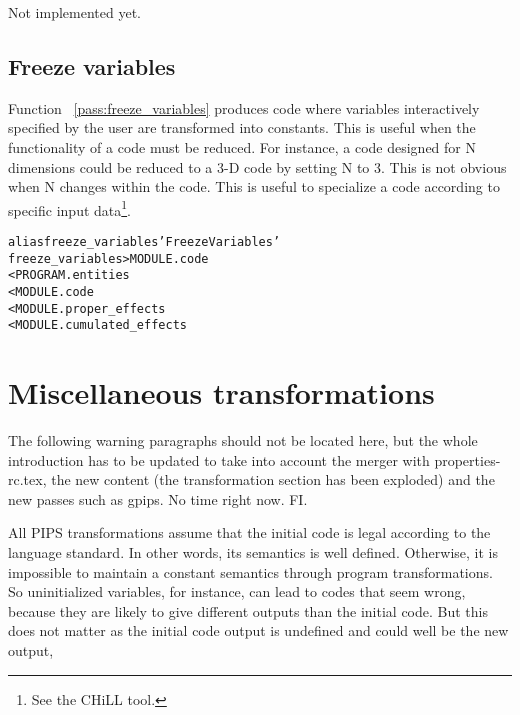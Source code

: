 \documentclass[a4paper]{report}
\newenvironment{PipsMake}{\begin{alltt}}{\end{alltt}}
\newcommand{\PipsPassRef}[1]{\texttt{\detokenize{#1}}~\ref{pass:#1}}
\newenvironment{PipsPass}[1]{\label{pass:#1}}{}
\begin{document}
Not implemented yet.

\subsection{Freeze variables}
\label{subsection-freeze-variables}

\begin{PipsPass}{freeze_variables}
Function \PipsPassRef{freeze_variables} produces code where variables
interactively specified by the user are transformed into
constants. This is useful when the functionality of a code must be
reduced. For instance, a code designed for N dimensions could be
reduced to a 3-D code by setting N to 3. This is not obvious when N
changes within the code.  This is useful to specialize
a code according to specific input data\footnote{See the CHiLL tool.}.
\end{PipsPass}

\begin{PipsMake}
alias freeze_variables 'Freeze Variables'
freeze_variables                   > MODULE.code
        < PROGRAM.entities
        < MODULE.code
        < MODULE.proper_effects
        < MODULE.cumulated_effects
\end{PipsMake}




\section{Miscellaneous transformations}

The following warning paragraphs should not be located here, but the
whole introduction has to be updated to take into account the merger
with properties-rc.tex, the new content (the transformation section
has been exploded) and the new passes such as gpips. No time right
now. FI.

All PIPS transformations assume that the initial code is legal
according to the language standard. In other words, its semantics is
well defined. Otherwise, it is impossible to maintain a constant
semantics through program transformations. So uninitialized variables,
for instance, can lead to codes that seem wrong, because they are
likely to give different outputs than the initial code. But this does
not matter as the initial code output is undefined and could well be
the new output,
\end{document}
